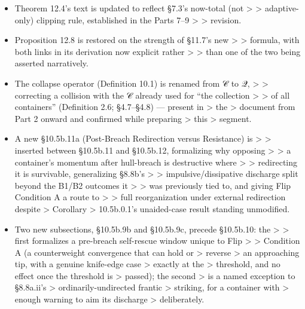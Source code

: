 \documentclass[
]{article}
\begin{document}
\begin{itemize}
  \textgreater{} \textgreater{} coherence N, completing the derivation
  Proposition 12.8 needs.
\item
  Theorem 12.4's text is updated to reflect §7.3's now-total (not
  \textgreater{} \textgreater{} adaptive-only) clipping rule,
  established in the Parts 7--9 \textgreater{} \textgreater{} revision.
\item
  Proposition 12.8 is restored on the strength of §11.7's new
  \textgreater{} \textgreater{} formula, with both links in its
  derivation now explicit rather \textgreater{} \textgreater{} than one
  of the two being asserted narratively.
\item
  The collapse operator (Definition 10.1) is renamed from 𝒞 to 𝒬,
  \textgreater{} \textgreater{} correcting a collision with the 𝒞
  already used for ``the collection \textgreater{} \textgreater{} of all
  containers'' (Definition 2.6; §4.7--§4.8) --- present in
  \textgreater{} the \textgreater{} document from Part 2 onward and
  confirmed while preparing \textgreater{} this \textgreater{} segment.
\item
  A new §10.5b.11a (Post-Breach Redirection versus Resistance) is
  \textgreater{} \textgreater{} inserted between §10.5b.11 and
  §10.5b.12, formalizing why opposing \textgreater{} \textgreater{} a
  container's momentum after hull-breach is destructive where
  \textgreater{} \textgreater{} redirecting it is survivable,
  generalizing §8.8b's \textgreater{} \textgreater{}
  impulsive/dissipative discharge split beyond the B1/B2 outcomes it
  \textgreater{} \textgreater{} was previously tied to, and giving Flip
  Condition A a route to \textgreater{} \textgreater{} full
  reorganization under external redirection despite \textgreater{}
  Corollary \textgreater{} 10.5b.0.1's unaided-case result standing
  unmodified.
\item
  Two new subsections, §10.5b.9b and §10.5b.9c, precede §10.5b.10: the
  \textgreater{} \textgreater{} first formalizes a pre-breach
  self-rescue window unique to Flip \textgreater{} \textgreater{}
  Condition A (a counterweight convergence that can hold or
  \textgreater{} reverse \textgreater{} an approaching tip, with a
  genuine knife-edge case \textgreater{} exactly at the \textgreater{}
  threshold, and no effect once the threshold is \textgreater{} passed);
  the second \textgreater{} is a named exception to §8.8a.ii's
  \textgreater{} ordinarily-undirected frantic \textgreater{} striking,
  for a container with \textgreater{} enough warning to aim its
  discharge \textgreater{} deliberately.

\end{itemize}
\end{document}
